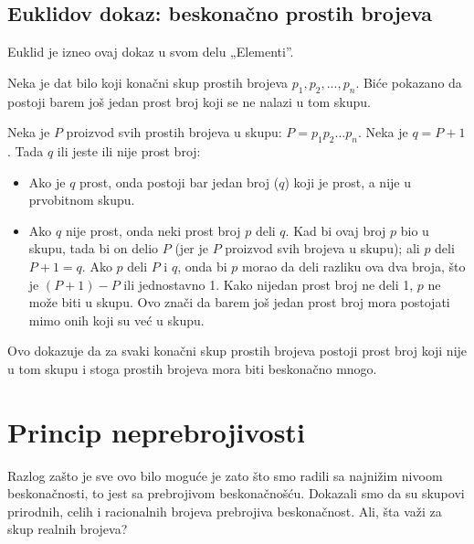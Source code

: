 \documentclass[a4paper]{article}
\begin{document}
\subsection{Euklidov dokaz: beskonačno prostih brojeva}
Euklid je izneo ovaj dokaz u svom delu „Elementi”.

Neka je dat bilo koji konačni skup prostih brojeva $p_{1}, p_{2}, ..., p_{n}$. Biće pokazano da postoji barem još jedan prost broj koji se ne nalazi u tom skupu.

Neka je $P$ proizvod svih prostih brojeva u skupu: $P = p_{1}p_{2}...p_{n}$. Neka je $q = P + 1$. Tada $q$ ili jeste ili nije prost broj:
\begin{itemize}
\item Ako je $q$ prost, onda postoji bar jedan broj ($q$) koji je prost, a nije u prvobitnom skupu.
\item Ako $q$ nije prost, onda neki prost broj $p$ deli $q$. Kad bi ovaj broj $p$ bio u skupu, tada bi on delio $P$ (jer je $P$ proizvod svih brojeva u skupu); ali $p$ deli $P + 1 = q$. Ako $p$ deli $P$ i $q$, onda bi $p$ morao da deli razliku
\cite{objasnjenje_deljenja} ova dva broja, što je $(P + 1) - P$ ili jednostavno 1. Kako nijedan prost broj ne deli 1, $p$ ne može biti u skupu. Ovo znači da barem još jedan prost broj mora postojati mimo onih koji su već u skupu.
\end{itemize} 

Ovo dokazuje da za svaki konačni skup prostih brojeva postoji prost broj koji nije u tom skupu i stoga prostih brojeva mora biti beskonačno mnogo.

\section{Princip neprebrojivosti}
Razlog zašto je sve ovo bilo moguće je zato što smo radili sa najnižim nivoom beskonačnosti, to jest sa prebrojivom beskonačnošću. Dokazali smo da su skupovi prirodnih, celih i racionalnih brojeva prebrojiva beskonačnost. Ali, šta važi za skup realnih brojeva? 
\end{document}
